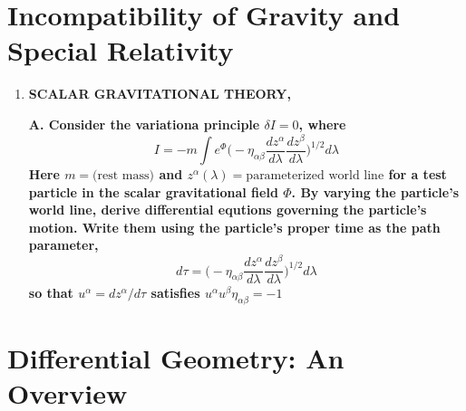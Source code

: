 \documentclass[9pt]{report}
\begin{document}
\chapter{Incompatibility of Gravity and Special Relativity}
\begin{enumerate}
  \item \textbf{SCALAR GRAVITATIONAL THEORY, \Phi}

    \textbf{A. Consider the variationa principle $\delta I = 0$, where}
    \[
      I = -m \int e^\Phi \Big( - \eta_{\alpha\beta} \frac{dz^\alpha}{d\lambda} \frac{dz^\beta}{d\lambda} \Big)^{1 / 2} d\lambda
    \]
    \textbf{Here $m = \text{(rest mass)}$ and $z^\alpha(\lambda)=\text{parameterized world line}$
    for a test particle in the scalar gravitational field $\Phi$. By varying the
    particle's world line, derive differential equtions governing the particle's
    motion. Write them using the particle's proper time as the path parameter,}
    \[
      d\tau = \Big( - \eta_{\alpha\beta} \frac{dz^\alpha}{d\lambda} \frac{dz^\beta}{d\lambda} \Big)^{1 / 2} d\lambda
    \]
    \textbf{so that $u^\alpha = dz^\alpha / d\tau$ satisfies $u^\alpha u^\beta \eta_{\alpha\beta} = -1$}
\end{enumerate}
\chapter{Differential Geometry: An Overview}
\end{document}
